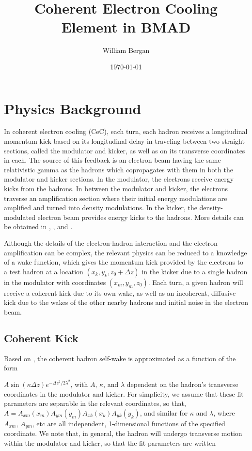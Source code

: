 \documentclass[letterpaper,11pt]{article}
\title{Coherent Electron Cooling Element in BMAD}
\author{William Bergan}
\date{\today}
\begin{document}
\maketitle



\section{Physics Background}

In coherent electron cooling (CeC), each turn, each hadron receives a longitudinal momentum kick based on its longitudinal delay in traveling between two straight sections, called the modulator and kicker, as well as on its transverse coordinates in each. The source of this feedback is an electron beam having the same relativistic gamma as the hadrons which copropagates with them in both the modulator and kicker sections. In the modulator, the electrons receive energy kicks from the hadrons. In between the modulator and kicker, the electrons traverse an amplification section where their initial energy modulations are amplified and turned into density modulations. In the kicker, the density-modulated electron beam provides energy kicks to the hadrons. More details can be obtained in \cite{cite:stupakovorig}, \cite{cite:stupakovamp}, and \cite{cite:stupakov3d}.

Although the details of the electron-hadron interaction and the electron amplification can be complex, the relevant physics can be reduced to a knowledge of a wake function, which gives the momentum kick provided by the electrons to a test hadron at a location $(x_k, y_k, z_0+\Delta z)$ in the kicker due to a single hadron in the modulator with coordinates $(x_m, y_m, z_0)$. Each turn, a given hadron will receive a coherent kick due to its own wake, as well as an incoherent, diffusive kick due to the wakes of the other nearby hadrons and initial noise in the electron beam.


\subsection{Coherent Kick}
Based on \cite{cite:nagaitsev}, the coherent hadron self-wake is approximated as a function of the form

\noindent
$A\sin(\kappa \Delta z)e^{-\Delta z^2/2\lambda^2}$, with $A$, $\kappa$, and $\lambda$ dependent on the hadron's transverse coordinates in the modulator and kicker. For simplicity, we assume that these fit parameters are separable in the relevant coordinates, so that, $A = A_{xm}(x_m) A_{ym}(y_m) A_{xk}(x_k) A_{yk}(y_k)$, and similar for $\kappa$ and $\lambda$, where $A_{xm}$, $A_{ym}$, etc are all independent, 1-dimensional functions of the specified coordinate. We note that, in general, the hadron will undergo transverse motion within the modulator and kicker, so that the fit parameters are written
\end{document}
